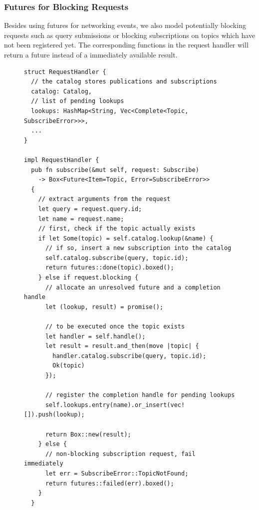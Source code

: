 \subsubsection{Futures for Blocking Requests}

Besides using futures for networking events, we also model potentially
blocking requests such as query submissions or blocking subscriptions on
topics which have not been registered yet. The corresponding functions in the
request handler will return a future instead of a immediately available
result. 


\begin{figure}[p]
\begin{lstlisting}[caption={[Handler for blocking subscription requests]
Example how a future is created for the subscription request. Depending
on whether it can be served immediately or not, different kinds of futures
are returned. Bookkeeping for still pending requests is done with completion
handles. Upon publication of a requested topic, any pending subscriptions will
be completed by calling \lstinline{lookup.complete()}.}]
struct RequestHandler {
  // the catalog stores publications and subscriptions
  catalog: Catalog,
  // list of pending lookups
  lookups: HashMap<String, Vec<Complete<Topic, SubscribeError>>>,
  ...
}

impl RequestHandler {
  pub fn subscribe(&mut self, request: Subscribe)
    -> Box<Future<Item=Topic, Error=SubscribeError>>
  {
    // extract arguments from the request
    let query = request.query.id;
    let name = request.name;
    // first, check if the topic actually exists
    if let Some(topic) = self.catalog.lookup(&name) {
      // if so, insert a new subscription into the catalog
      self.catalog.subscribe(query, topic.id);
      return futures::done(topic).boxed();
    } else if request.blocking {
      // allocate an unresolved future and a completion handle
      let (lookup, result) = promise();

      // to be executed once the topic exists
      let handler = self.handle();
      let result = result.and_then(move |topic| {
        handler.catalog.subscribe(query, topic.id);
        Ok(topic)
      });

      // register the completion handle for pending lookups
      self.lookups.entry(name).or_insert(vec![]).push(lookup);

      return Box::new(result);
    } else {
      // non-blocking subscription request, fail immediately
      let err = SubscribeError::TopicNotFound;
      return futures::failed(err).boxed();
    }
  }
\end{lstlisting}
\end{figure}

